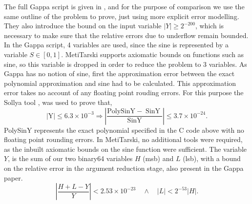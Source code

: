 \documentclass{fac}
\begin{document}
The full Gappa script is given in \cite{5483294}, and for the purpose of comparison we use the same outline of the problem to prove, just using more explicit error modelling. They also introduce the bound on the input variable $|Y|\geq 2^{-200}$, which is necessary to make sure that the relative errors due to underflow remain bounded. In the Gappa script, 4 variables are used, since the sine is represented by a variable $S\in[0,1]$. MetiTarski supports axiomatic bounds on functions such as sine, so this variable is dropped in order to reduce the problem to 3 variables. As Gappa has no notion of sine, first the approximation error between the exact polynomial approximation and sine had to be calculated. This approximation error takes no account of any floating point rouding errors. For this purpose the Sollya tool \cite{ChevillardJoldesLauter2010}, was used to prove that,
\begin{equation}
|\mathrm{Y}| \leq 6.3 \times 10^{-3} \Rightarrow\left|\frac{\mathrm{PolySinY}-\operatorname{SinY}}{\operatorname{SinY}}\right| \leq 3.7 \times 10^{-24}.
\end{equation}
PolySinY represents the exact polynomial specified in the C code above with no floating point rounding errors. In MetiTarski, no additional tools were required, as the inbuilt axiomatic bounds on the sine function were sufficient. The variable $Y$, is the sum of our two binary64 variables $H$ (msb) and $L$ (lsb), with a bound on the relative error in the argument reduction stage, also present in the Gappa paper.
\begin{equation*}
    \left|\frac{H+L-Y}{Y}\right| < 2.53\times 10^{-23} \quad \land \quad |L|<2^{-53}|H|.
\end{equation*}
\end{document}
